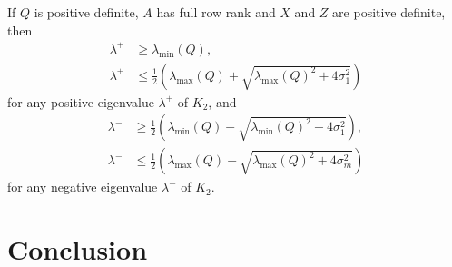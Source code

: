 \documentclass{amsart}
\begin{document}
\begin{blemma}
  \label{lem:eigs-RW}
  If $Q$ is positive definite,
  $A$ has full row rank and $X$ and $Z$ are positive definite,
  then
  \begin{align*}
    \lambda^+ & \geq \lambda_{\min}(Q), \\
    \lambda^+ & \leq
      \tfrac{1}{2}
      \left(
        \lambda_{\max}(Q) + \sqrt{\lambda_{\max}(Q)^2 + 4 \sigma_1^2}
      \right)
  \end{align*}
  for any positive eigenvalue $\lambda^+$ of $K_2$, and
  \begin{align*}
    \lambda^- & \geq
      \tfrac{1}{2}
      \left(
        \lambda_{\min}(Q) - \sqrt{\lambda_{\min}(Q)^2 + 4 \sigma_1^2}
      \right), \\
    \lambda^- & \leq
      \tfrac{1}{2}
      \left(
        \lambda_{\max}(Q) - \sqrt{\lambda_{\max}(Q)^2 + 4 \sigma_m^2}
      \right)
  \end{align*}
  for any negative eigenvalue $\lambda^-$ of $K_2$.
\end{blemma}

\section{Conclusion}



\end{document}
